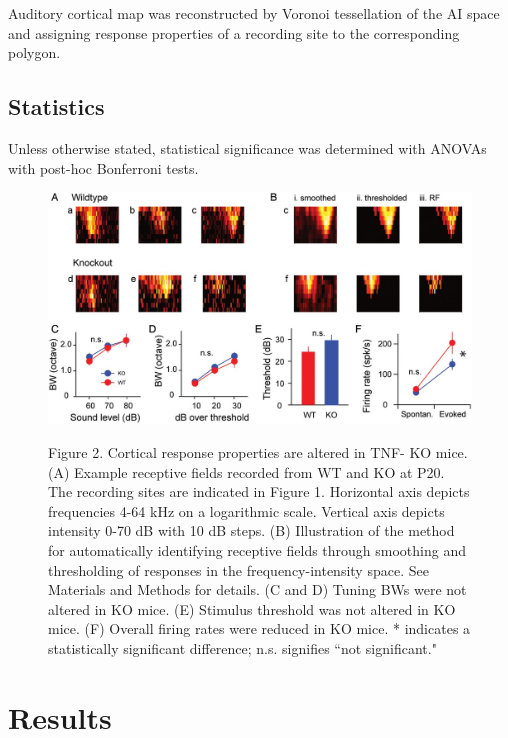 Auditory cortical map was reconstructed by Voronoi tessellation of the AI space and assigning response properties of a recording site to the corresponding polygon.

\subsection{Statistics}

Unless otherwise stated, statistical significance was determined with ANOVAs with post-hoc Bonferroni tests.

\begin{figure}
	\centering
		\includegraphics[width=6in]{images/C3F2}
	\begin{changemargin}{1in}{1in}
	\footnotesize{Figure 2. Cortical response properties are altered in TNF-\textalpha{} KO mice. (A) Example receptive fields recorded from WT and KO at P20. The recording sites are indicated in Figure 1. Horizontal axis depicts frequencies 4-64 kHz on a logarithmic scale. Vertical axis depicts intensity 0-70 dB with 10 dB steps. (B) Illustration of the method for automatically identifying receptive fields through smoothing and thresholding of responses in the frequency-intensity space. See Materials and Methods for details. (C and D) Tuning BWs were not altered in KO mice. (E) Stimulus threshold was not altered in KO mice. (F) Overall firing rates were reduced in KO mice. * indicates a statistically significant difference; n.s. signifies ``not significant."}
	\end{changemargin}
\end{figure}

\section{Results}

